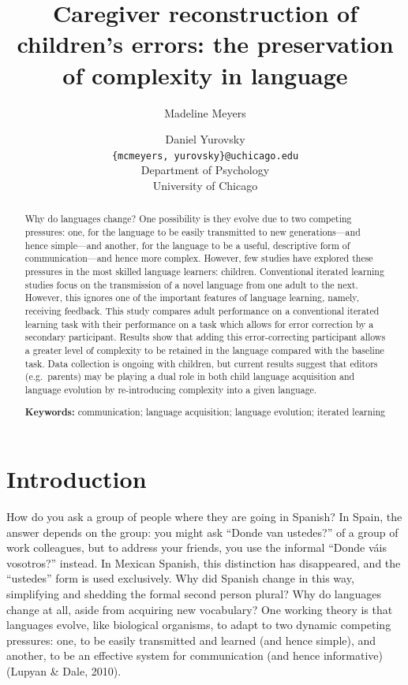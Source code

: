 \documentclass[10pt, letterpaper]{article}
\title{Caregiver reconstruction of children's errors: the preservation of
complexity in language}
\author{Madeline Meyers \and Daniel Yurovsky \\
        \texttt{\{mcmeyers, yurovsky\}@uchicago.edu} \\
       Department of Psychology \\ University of Chicago}
\begin{document}
\maketitle

\begin{abstract}
Why do languages change? One possibility is they evolve due to two
competing pressures: one, for the language to be easily transmitted to
new generations---and hence simple---and another, for the language to be
a useful, descriptive form of communication---and hence more complex.
However, few studies have explored these pressures in the most skilled
language learners: children. Conventional iterated learning studies
focus on the transmission of a novel language from one adult to the
next. However, this ignores one of the important features of language
learning, namely, receiving feedback. This study compares adult
performance on a conventional iterated learning task with their
performance on a task which allows for error correction by a secondary
participant. Results show that adding this error-correcting participant
allows a greater level of complexity to be retained in the language
compared with the baseline task. Data collection is ongoing with
children, but current results suggest that editors (e.g.~parents) may be
playing a dual role in both child language acquisition and language
evolution by re-introducing complexity into a given language.

\textbf{Keywords:}
communication; language acquisition; language evolution; iterated
learning
\end{abstract}

\section{Introduction}\label{introduction}

How do you ask a group of people where they are going in Spanish? In
Spain, the answer depends on the group: you might ask ``Donde van
ustedes?'' of a group of work colleagues, but to address your friends,
you use the informal ``Donde váis vosotros?'' instead. In Mexican
Spanish, this distinction has disappeared, and the ``ustedes'' form is
used exclusively. Why did Spanish change in this way, simplifying and
shedding the formal second person plural? Why do languages change at
all, aside from acquiring new vocabulary? One working theory is that
languages evolve, like biological organisms, to adapt to two dynamic
competing pressures: one, to be easily transmitted and learned (and
hence simple), and another, to be an effective system for communication
(and hence informative)(Lupyan \& Dale, 2010).
\end{document}

